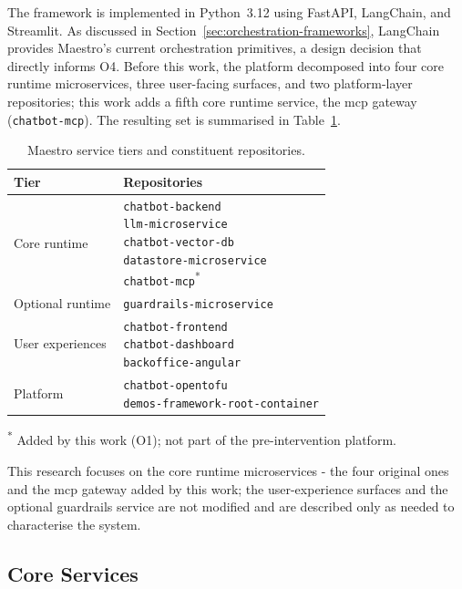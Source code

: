 The framework is implemented in Python~3.12 using FastAPI, LangChain, and
Streamlit.
As discussed in Section~\ref{sec:orchestration-frameworks}, LangChain provides
Maestro's current orchestration primitives, a design decision that directly
informs O4.
Before this work, the platform decomposed into four core runtime microservices,
three user-facing surfaces, and two platform-layer repositories; this work adds
a fifth core runtime service, the \gls{mcp} gateway (\texttt{chatbot-mcp}).
The resulting set is summarised in Table~\ref{tab:service-tiers}.

\begin{table}[ht]
\centering
\caption{Maestro service tiers and constituent repositories.}
\label{tab:service-tiers}
\begin{tabular}{@{}l l@{}}
\toprule
\textbf{Tier} & \textbf{Repositories} \\
\midrule
Core runtime &
  \makecell[tl]{\texttt{chatbot-backend} \\ \texttt{llm-microservice} \\ \texttt{chatbot-vector-db} \\ \texttt{datastore-microservice} \\ \texttt{chatbot-mcp}\textsuperscript{*}} \\
Optional runtime & \texttt{guardrails-microservice} \\
User experiences &
  \makecell[tl]{\texttt{chatbot-frontend} \\ \texttt{chatbot-dashboard} \\ \texttt{backoffice-angular}} \\
Platform &
  \makecell[tl]{\texttt{chatbot-opentofu} \\ \texttt{demos-framework-root-container}} \\
\bottomrule
\end{tabular}

\smallskip
{\footnotesise\textsuperscript{*} Added by this work (O1); not part of the pre-intervention platform.}
\end{table}

This research focuses on the core runtime microservices - the four original
ones and the \gls{mcp} gateway added by this work; the
user-experience surfaces and the optional guardrails service are not modified
and are described only as needed to characterise the system.

\subsection{Core Services}
\label{subsec:core-services}


